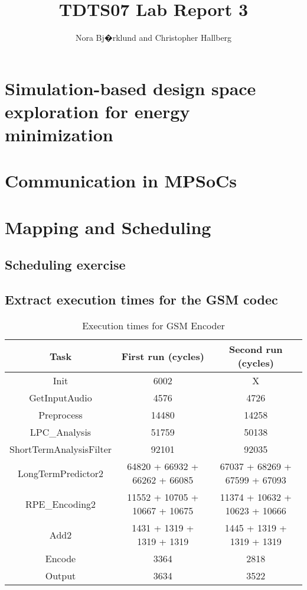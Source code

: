 \documentclass[12pt]{article}
\title{TDTS07 Lab Report 3}
\author{Nora Bj�rklund and Christopher Hallberg}
\begin{document}
\maketitle

\section{Simulation-based design space exploration for energy minimization}
\section{Communication in MPSoCs}
\section{Mapping and Scheduling}
\subsection{Scheduling exercise}
\subsection{Extract execution times for the GSM codec}

\begin{table}[h]
  \centering
  \begin{tabular}{c c c}
    \hline
    Task & First run (cycles) & Second run (cycles) \\
    \hline
    Init & 6002  & X \\
    GetInputAudio & 4576  & 4726 \\
    Preprocess & 14480  & 14258  \\
    LPC_Analysis & 51759  & 50138 \\
    ShortTermAnalysisFilter & 92101 & 92035 \\
    LongTermPredictor2 & 64820 + 66932 + 66262 + 66085 & 67037 + 68269 + 67599 + 67093 \\
    RPE_Encoding2 & 11552 + 10705 + 10667 + 10675 & 11374 + 10632 + 10623 + 10666\\
    Add2 & 1431 + 1319 + 1319 + 1319 & 1445 + 1319 + 1319 + 1319\\
    Encode & 3364 & 2818 \\
    Output & 3634 & 3522 \\
  \end{tabular}
  \caption{Execution times for GSM Encoder}
\end{table}
\end{document}
